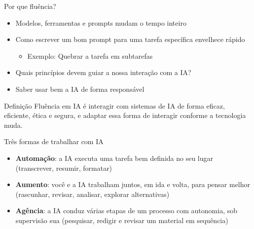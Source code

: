 \documentclass[aspectratio=169,11pt]{beamer}
\newcommand{\hl}[1]{\textcolor{terracota}{#1}}
\begin{document}
\begin{frame}{Por que fluência?}
  \begin{itemize}
    \item Modelos, ferramentas e prompts \hl{mudam o tempo inteiro} 
    \item Como escrever um bom prompt para uma tarefa específica envelhece rápido 
    \begin{itemize}
      \item Exemplo: Quebrar a tarefa em subtarefas
    \end{itemize}
    \item \hl{Quais princípios devem guiar a nossa interação com a IA?}
    \item \hl{Saber usar bem} a IA \hl{de forma responsável}
  \end{itemize}

  \vspace{0.3cm}
  \begin{notebox}{Definição}
    \small Fluência em IA é interagir com sistemas de IA de forma eficaz, eficiente, ética e segura, e adaptar essa forma de interagir conforme a tecnologia muda.
  \end{notebox}
\end{frame}

\begin{frame}{Três formas de trabalhar com IA}
  \begin{itemize}
    \item \textbf{Automação}: a IA executa uma tarefa bem definida no seu lugar (transcrever, resumir, formatar)
    \item \textbf{Aumento}: você e a IA trabalham juntos, em ida e volta, para pensar melhor (rascunhar, revisar, analisar, explorar alternativas)
    \item \textbf{Agência}: a IA conduz várias etapas de um processo com autonomia, sob supervisão sua (pesquisar, redigir e revisar um material em sequência)
  \end{itemize}
\end{frame}
\end{document}
